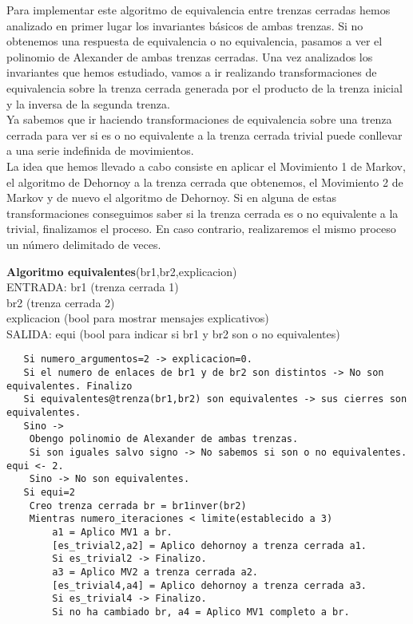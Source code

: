 Para implementar este algoritmo de equivalencia entre trenzas cerradas hemos analizado en primer lugar los invariantes básicos de ambas trenzas. Si no obtenemos una respuesta de equivalencia  o no equivalencia, pasamos a ver el polinomio de Alexander de ambas trenzas cerradas. Una vez analizados los invariantes que hemos estudiado, vamos a ir realizando transformaciones de equivalencia sobre la trenza cerrada generada por el producto de la trenza inicial y la inversa de la segunda trenza. \\

Ya sabemos que ir haciendo transformaciones de equivalencia sobre una trenza cerrada para ver si es o no equivalente a la trenza cerrada trivial puede conllevar a una serie indefinida de movimientos. \\

La idea que hemos llevado a cabo consiste en aplicar el Movimiento 1 de Markov, el algoritmo de Dehornoy a la trenza cerrada que obtenemos, el Movimiento 2 de Markov y de nuevo el algoritmo de Dehornoy. Si en alguna de estas transformaciones conseguimos saber si la trenza cerrada es o no equivalente a la trivial, finalizamos el proceso. En caso contrario, realizaremos el mismo proceso un número delimitado de veces. \\

\newpage
\begin{alg}
	\textbf{Algoritmo equivalentes}(br1,br2,explicacion)\\
	ENTRADA: br1 (trenza cerrada 1)\\
	\hspace*{2.2cm} br2 (trenza cerrada 2)\\
	\hspace*{2.2cm} explicacion (bool para mostrar mensajes explicativos)\\
	SALIDA: \hspace{0.4cm} equi (bool para indicar si br1 y br2 son o no equivalentes)
	
\begin{lstlisting}
   Si numero_argumentos=2 -> explicacion=0.
   Si el numero de enlaces de br1 y de br2 son distintos -> No son equivalentes. Finalizo
   Si equivalentes@trenza(br1,br2) son equivalentes -> sus cierres son equivalentes.
   Sino ->   
   	Obengo polinomio de Alexander de ambas trenzas.
	Si son iguales salvo signo -> No sabemos si son o no equivalentes. equi <- 2.
	Sino -> No son equivalentes.
   Si equi=2
    Creo trenza cerrada br = br1inver(br2)
    Mientras numero_iteraciones < limite(establecido a 3)
	    a1 = Aplico MV1 a br.
	    [es_trivial2,a2] = Aplico dehornoy a trenza cerrada a1. 
	    Si es_trivial2 -> Finalizo.
	    a3 = Aplico MV2 a trenza cerrada a2.
	    [es_trivial4,a4] = Aplico dehornoy a trenza cerrada a3. 
	    Si es_trivial4 -> Finalizo.
	    Si no ha cambiado br, a4 = Aplico MV1 completo a br. 
	   
\end{lstlisting}
\end{alg}

